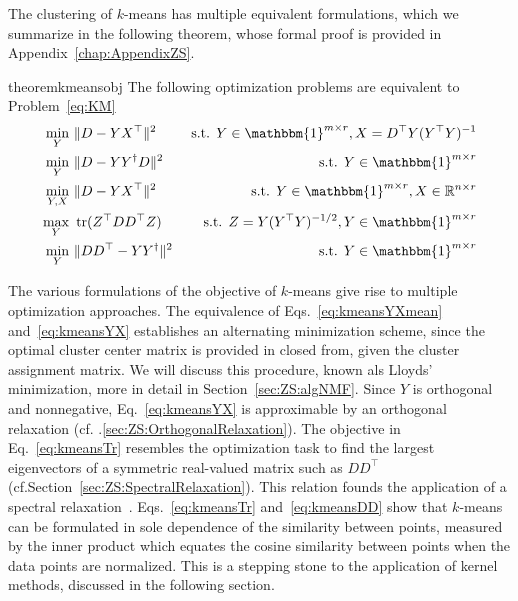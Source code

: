 The clustering of $k$-means has multiple equivalent formulations, which we summarize in the following theorem, whose formal proof is provided in Appendix~\ref{chap:AppendixZS}.
\begin{restatable}{theorem}{kmeansobj}\label{thm:kmeansobj}
The following optimization problems are equivalent to Problem~\eqref{eq:KM}
\begin{align}
\min_{Y}\ &\|D-YX^\top\|^2 &\text{ s.t. } Y\in\mathbbm{1}^{m\times r}, X=D^\top Y(Y^\top Y)^{-1} \label{eq:kmeansYXmean} \\
\min_{Y}\ &\|D-YY^\dagger D\|^2 &\text{ s.t. } Y\in\mathbbm{1}^{m\times r} \label{eq:kmeansYYdaggerD} \\
\min_{Y,X}\ &\|D-YX^\top\|^2 &\text{ s.t. } Y\in\mathbbm{1}^{m\times r}, X\in\mathbb{R}^{n\times r} \label{eq:kmeansYX} \\
\max_{Y}\ &\tr(Z^\top DD^\top Z)&\text{ s.t. } Z= Y(Y^\top Y)^{-1/2}, Y\in\mathbbm{1}^{m\times r} \label{eq:kmeansTr} \\
\min_{Y}\ &\|DD^\top - YY^\dagger\|^2 &\text{ s.t. }   Y\in\mathbbm{1}^{m\times r} \label{eq:kmeansDD}
\end{align}
\end{restatable}
The various formulations of the objective of $k$-means give rise to multiple optimization approaches. The equivalence of Eqs.~\eqref{eq:kmeansYXmean} and~\eqref{eq:kmeansYX} establishes an alternating minimization scheme, since the optimal cluster center matrix is provided in closed from, given the cluster assignment matrix. We will discuss this procedure, known als Lloyds' minimization, more in detail in Section~\ref{sec:ZS:algNMF}. Since $Y$ is orthogonal and nonnegative, Eq.~\eqref{eq:kmeansYX} is approximable by an orthogonal relaxation (cf. \@Sec.\ref{sec:ZS:OrthogonalRelaxation}).
The objective in Eq.~\eqref{eq:kmeansTr} resembles the optimization task to find the largest eigenvectors of a symmetric real-valued matrix such as $DD^\top$ (cf.\@ Section~\ref{sec:ZS:SpectralRelaxation}). This relation founds the application of a spectral relaxation~\citep{zha2002spectral}. 
Eqs.~\@\eqref{eq:kmeansTr} and~\@\eqref{eq:kmeansDD} show that $k$-means can be formulated in sole dependence of the similarity between points, measured by the inner product which equates the cosine similarity between points when the data points are normalized. This is a stepping stone to the application of kernel methods, discussed in the following section.

